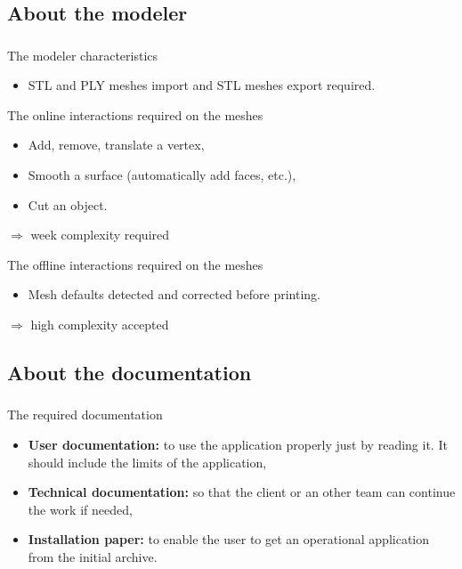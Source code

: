 \documentclass{beamer}
\begin{document}
\subsection{About the modeler}
\begin{frame}
	\frametitle{}
	 \begin{block}{The modeler characteristics}
		\begin{itemize}
			\item STL and PLY meshes import and STL meshes export required.
		\end{itemize}
    \end{block}
    
    \begin{block}{The online interactions required on the meshes}
		\begin{itemize}
			\item Add, remove, translate a vertex,
			\item Smooth a surface (automatically add faces, etc.),
			\item Cut an object.
		\end{itemize}
			$\Longrightarrow$ week complexity required
    \end{block}
    
    \begin{block}{The offline interactions required on the meshes}
		\begin{itemize}
			\item Mesh defaults detected and corrected before printing.
		\end{itemize}
			$\Longrightarrow$ high complexity accepted
    \end{block}

\end{frame}

\subsection{About the documentation}
\begin{frame}
	\frametitle{}
	 \begin{block}{The required documentation}
		\begin{itemize}
			\item \textbf{User documentation:} to use the application properly just by reading it. It should include the limits of the application,
			\item \textbf{Technical documentation:} so that the client or an other team can continue the work if needed,
			\item \textbf{Installation paper:} to enable the user to get an operational application from the initial archive.
		\end{itemize}
    \end{block}    

\end{frame}
\end{document}

